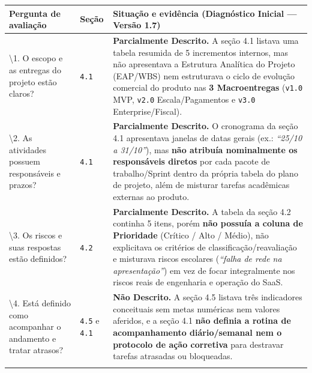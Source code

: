{\footnotesize
\begin{tabularx}{\textwidth}{>{\fontSemiBold\color{BrandNavy}\hsize\sloppy\arraybackslash}X C{1.70cm} >{\hsize\sloppy\arraybackslash}X}
\toprule
{}
\textbf{Pergunta de avaliação} & \textbf{Seção} & \textbf{Situação e evidência (Diagnóstico Inicial --- Versão 1.7)} \\
\midrule
{}
\textbackslash1. O escopo e as entregas do projeto estão claros? & \texttt{4.1} & \textbf{Parcialmente Descrito.} A seção 4.1 listava uma tabela resumida de 5 incrementos internos, mas não apresentava a Estrutura Analítica do Projeto (EAP/WBS) nem estruturava o ciclo de evolução comercial do produto nas \textbf{3 Macroentregas} (\texttt{v1.0} MVP, \texttt{v2.0} Escala/Pagamentos e \texttt{v3.0} Enterprise/Fiscal). \\
\midrule
\textbackslash2. As atividades possuem responsáveis e prazos? & \texttt{4.1} & \textbf{Parcialmente Descrito.} O cronograma da seção 4.1 apresentava janelas de datas gerais (ex.: \emph{``25/10 a 31/10''}), mas \textbf{não atribuía nominalmente os responsáveis diretos} por cada pacote de trabalho/Sprint dentro da própria tabela do plano de projeto, além de misturar tarefas acadêmicas externas ao produto. \\
\midrule
\textbackslash3. Os riscos e suas respostas estão definidos? & \texttt{4.2} & \textbf{Parcialmente Descrito.} A tabela da seção 4.2 continha 5 itens, porém \textbf{não possuía a coluna de Prioridade} (Crítico / Alto / Médio), não explicitava os critérios de classificação/reavaliação e misturava riscos escolares (\emph{``falha de rede na apresentação''}) em vez de focar integralmente nos riscos reais de engenharia e operação do SaaS. \\
\midrule
\textbackslash4. Está definido como acompanhar o andamento e tratar atrasos? & \texttt{4.5} e \texttt{4.1} & \textbf{Não Descrito.} A seção 4.5 listava três indicadores conceituais sem metas numéricas nem valores aferidos, e a seção 4.1 \textbf{não definia a rotina de acompanhamento diário/semanal nem o protocolo de ação corretiva} para destravar tarefas atrasadas ou bloqueadas. \\
\bottomrule
\end{tabularx}%
}
